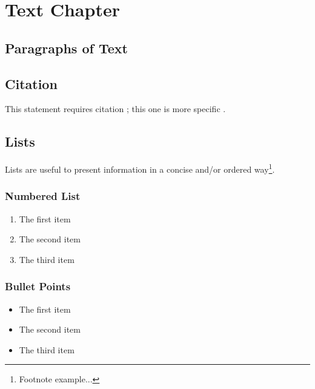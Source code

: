 \documentclass[11pt,fleqn]{book} %
\begin{document}
\chapter{Text Chapter}

\section{Paragraphs of Text}

\lipsum[1-7] %


\section{Citation}

This statement requires citation \cite{book_key}; this one is more specific \cite[122]{article_key}.


\section{Lists}

Lists are useful to present information in a concise and/or ordered way\footnote{Footnote example...}.

\subsection{Numbered List}

\begin{enumerate}
\item The first item
\item The second item
\item The third item
\end{enumerate}

\subsection{Bullet Points}

\begin{itemize}
\item The first item
\item The second item
\item The third item
\end{itemize}
\end{document}
